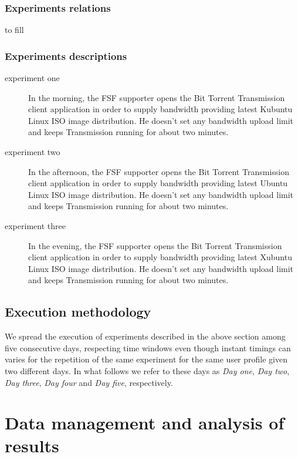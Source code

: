 \documentclass[10pt,a4paper]{article}
\begin{document}
    \subsubsection*{Experiments relations}
    to fill

    \subsubsection*{Experiments descriptions}
    
    \begin{description}
    \item[experiment one] In the morning, the FSF supporter opens the
      Bit Torrent Transmission client application in order to supply
      bandwidth providing latest Kubuntu Linux ISO image
      distribution. He doesn't set any bandwidth upload limit and
      keeps Transmission running for about two minutes.
    \item[experiment two] In the afternoon, the FSF supporter opens
      the Bit Torrent Transmission client application in order to
      supply bandwidth providing latest Ubuntu Linux ISO image
      distribution. He doesn't set any bandwidth upload limit and
      keeps Transmission running for about two minutes.
    \item[experiment three] In the evening, the FSF supporter opens
      the Bit Torrent Transmission client application in order to
      supply bandwidth providing latest Xubuntu Linux ISO image
      distribution. He doesn't set any bandwidth upload limit and
      keeps Transmission running for about two minutes.
    \end{description}

    \subsection{Execution methodology}

    We spread the execution of experiments described in the above
    section among five consecutive days, respecting time windows even
    though instant timings can varies for the repetition of the same
    experiment for the same user profile given two different days. In
    what follows we refer to these days as \emph{Day one}, \emph{Day
      two}, \emph{Day three}, \emph{Day four} and \emph{Day five},
    respectively.

    \newpage
    \section{Data management and analysis of results}
    \label{sec:data-management-result-analysis}
    \lipsum[1]
    
\end{document}

